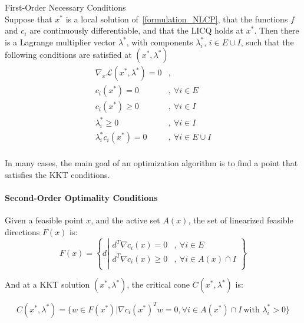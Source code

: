 \begin{theorem}{First-Order Necessary Conditions}\\
\label{KKT_conditions}
  Suppose that $x^*$ is a local solution of~\ref{formulation_NLCP}, that the functions $f$ and $c_i$ are continuously differentiable, and that the LICQ holds at $x^*$.
  Then there is a Lagrange multiplier vector $\lambda^*$, with components $\lambda_i^*$, $i\in E\cup I$, such that the following conditions are satisfied at $(x^*,\lambda^*)$
  \begin{equation}
  \begin{array}{ll}
    \nabla_x\mathcal{L}(x^*,\lambda^*) = 0 &, \\
    c_i(x^*) = 0 &,\ \forall i\in E\\
    c_i(x^*) \geq 0 &,\ \forall i\in I\\
    \lambda_i^* \geq 0 &,\ \forall i\in I\\
    \lambda_i^* c_i(x^*)=0 &,\ \forall i \in E\cup I\\
  \end{array}
  \end{equation}
\end{theorem}

In many cases, the main goal of an optimization algorithm is to find a point that satisfies the KKT conditions.

\paragraph{Second-Order Optimality Conditions}

\begin{definition}
  Given a feasible point $x$, and the active set $\mathit{A}(x)$, the  set of linearized feasible directions $F(x)$ is:
  \begin{equation}
    F(x)=\left\{d\left|
        \begin{array}{ll}
          d^T\nabla c_i(x) = 0&,\ \forall i\in E \\
          d^T\nabla c_i(x) \geq 0&,\ \forall i\in \mathit{A}(x)\cap I \\
        \end{array}
        \right.
    \right\}
  \end{equation}
\end{definition}

And at a KKT solution $(x^*,\lambda^*)$, the critical cone $C(x^*, \lambda^*)$ is:

\begin{equation}
  C(x^*,\lambda^*) = \{w\in F(x^*)|{\nabla c_i(x^*)}^T w=0, \forall i\in\mathit{A}(x^*)\cap I\ \text{with } \lambda_i^*>0\}
\end{equation}

